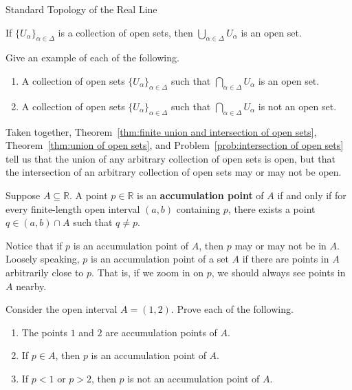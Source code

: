 \begin{section}{Standard Topology of the Real Line}
\begin{theorem}\label{thm:union of open sets}
If $\{U_{\alpha}\}_{\alpha\in\Delta}$ is a collection of open sets, then $\bigcup_{\alpha\in\Delta} U_{\alpha}$ is an open set.
\end{theorem}

\begin{problem}\label{prob:intersection of open sets}
Give an example of each of the following.
\begin{enumerate}[label=\textrm{(\alph*)}]
\item A collection of open sets $\{U_{\alpha}\}_{\alpha\in\Delta}$ such that $\bigcap_{\alpha\in\Delta} U_{\alpha}$ is an open set.
\item A collection of open sets $\{U_{\alpha}\}_{\alpha\in\Delta}$ such that $\bigcap_{\alpha\in\Delta} U_{\alpha}$ is not an open set.
\end{enumerate}
\end{problem}

\begin{remark}\label{rem:union vs intersection of open sets}
Taken together, Theorem~\ref{thm:finite union and intersection of open sets}, Theorem~\ref{thm:union of open sets}, and Problem~\ref{prob:intersection of open sets} tell us that the union of any arbitrary collection of open sets is open, but that the intersection of an arbitrary collection of open sets may or may not be open.  
\end{remark}

\begin{definition}
Suppose $A\subseteq \mathbb{R}$. A point $p\in \mathbb{R}$ is an \textbf{accumulation point} of $A$ if and only if for every finite-length open interval $(a,b)$ containing $p$, there exists a point $q \in (a,b)\cap A$ such that $q\neq p$.
\end{definition}

Notice that if $p$ is an accumulation point of $A$, then $p$ may or may not be in $A$. Loosely speaking, $p$ is an accumulation point of a set $A$ if there are points in $A$ arbitrarily close to $p$. That is, if we zoom in on $p$, we should always see points in $A$ nearby.

\begin{problem}
Consider the open interval $A=(1,2)$. Prove each of the following.
\begin{enumerate}[label=\textrm{(\alph*)}]
\item The points $1$ and $2$ are accumulation points of $A$.
\item If $p\in A$, then $p$ is an accumulation point of $A$.
\item If $p<1$ or $p>2$, then $p$ is not an accumulation point of $A$.
\end{enumerate}
\end{problem}


\end{section}

